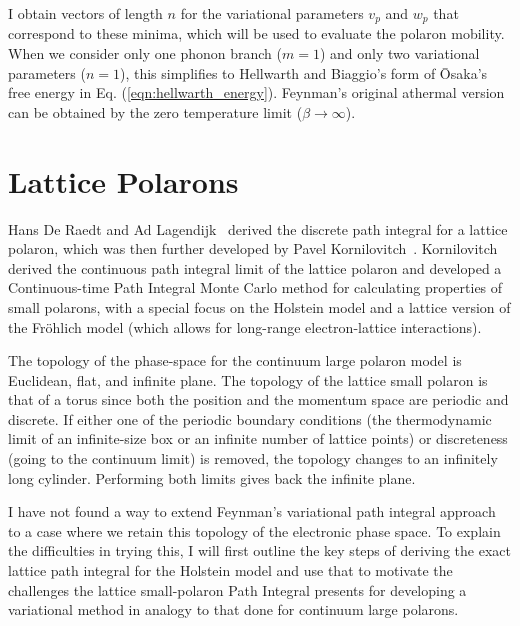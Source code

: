 I obtain vectors of length $n$ for the variational parameters $v_{p}$ and $w_{p}$ that correspond to these minima, which will be used to evaluate the polaron mobility. When we consider only one phonon branch ($m = 1$) and only two variational parameters ($n = 1$), this simplifies to Hellwarth and Biaggio's form of \=Osaka's free energy in Eq. (\ref{eqn:hellwarth_energy}). Feynman's original athermal version can be obtained by the zero temperature limit ($\beta \rightarrow \infty$).

\section{Lattice Polarons}
\label{sec:3-2}

Hans De Raedt and Ad Lagendijk~\cite{de_raedt_numerical_1983, de_raedt_monte_1985} derived the discrete path integral for a lattice polaron, which was then further developed by Pavel Kornilovitch~\cite{kornilovitch_polaron_1997, kornilovitch_continuous-time_1998, kornilovitch_ground-state_1999, kornilovitch_giant_1999, kornilovitch_band_2000, kornilovitch_feynmans_2004, kornilovitch_path_2007}. Kornilovitch derived the continuous path integral limit of the lattice polaron and developed a Continuous-time Path Integral Monte Carlo method for calculating properties of small polarons, with a special focus on the Holstein model and a lattice version of the Fr\"ohlich model (which allows for long-range electron-lattice interactions).

The topology of the phase-space for the continuum large polaron model is Euclidean, flat, and infinite plane. The topology of the lattice small polaron is that of a torus since both the position and the momentum space are periodic and discrete. If either one of the periodic boundary conditions (the thermodynamic limit of an infinite-size box or an infinite number of lattice points) or discreteness (going to the continuum limit) is removed, the topology changes to an infinitely long cylinder. Performing both limits gives back the infinite plane.

I have not found a way to extend Feynman's variational path integral approach to a case where we retain this topology of the electronic phase space. To explain the difficulties in trying this, I will first outline the key steps of deriving the exact lattice path integral for the Holstein model and use that to motivate the challenges the lattice small-polaron Path Integral presents for developing a variational method in analogy to that done for continuum large polarons.

